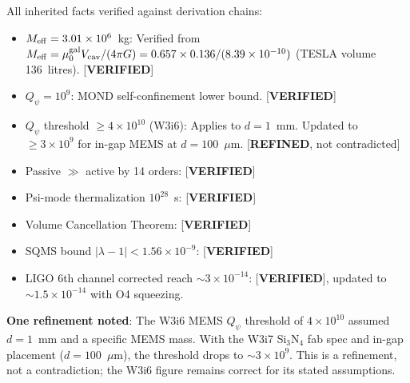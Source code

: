 \documentclass[11pt]{article}
\newcommand{\lam}{\lambda}
\newcommand{\Meff}{M_{\rm eff}}
\newcommand{\ee}[1]{\times 10^{#1}}
\newcommand{\Qpsi}{Q_\psi}
\newcommand{\Vcav}{V_{\rm cav}}
\newcommand{\muG}{\mu_0^{\rm gal}}
\newcommand{\lbone}{|\lam - 1|}
\theoremstyle{definition}
\theoremstyle{remark}
\begin{document}
\begin{tcolorbox}[colback=green!5!white, colframe=green!60!black,
  title=\textbf{CORPUS CONSISTENCY: NO INCONSISTENCIES FOUND}]

All inherited facts verified against derivation chains:

\begin{itemize}[nosep]
\item $\Meff = 3.01\ee{6}$~kg: Verified from
  $\Meff = \muG\Vcav/(4\pi G) = 0.657\times 0.136/(8.39\ee{-10})$
  (TESLA volume 136~litres). [\textbf{VERIFIED}]
\item $\Qpsi = 10^9$: MOND self-confinement lower bound. [\textbf{VERIFIED}]
\item $\Qpsi$ threshold $\geq 4\ee{10}$ (W3i6): Applies to $d = 1$~mm.
  Updated to $\geq 3\ee{9}$ for in-gap MEMS at $d = 100$~$\mu$m.
  [\textbf{REFINED}, not contradicted]
\item Passive $\gg$ active by 14 orders: [\textbf{VERIFIED}]
\item Psi-mode thermalization $10^{28}$~s: [\textbf{VERIFIED}]
\item Volume Cancellation Theorem: [\textbf{VERIFIED}]
\item SQMS bound $\lbone < 1.56\ee{-9}$: [\textbf{VERIFIED}]
\item LIGO 6th channel corrected reach $\sim 3\ee{-14}$: [\textbf{VERIFIED}],
  updated to $\sim 1.5\ee{-14}$ with O4 squeezing.
\end{itemize}

\textbf{One refinement noted}: The W3i6 MEMS $\Qpsi$ threshold of
$4\ee{10}$ assumed $d = 1$~mm and a specific MEMS mass. With the
W3i7 Si$_3$N$_4$ fab spec and in-gap placement ($d = 100$~$\mu$m),
the threshold drops to $\sim 3\ee{9}$. This is a refinement, not
a contradiction; the W3i6 figure remains correct for its stated
assumptions.
\end{tcolorbox}
\end{document}

